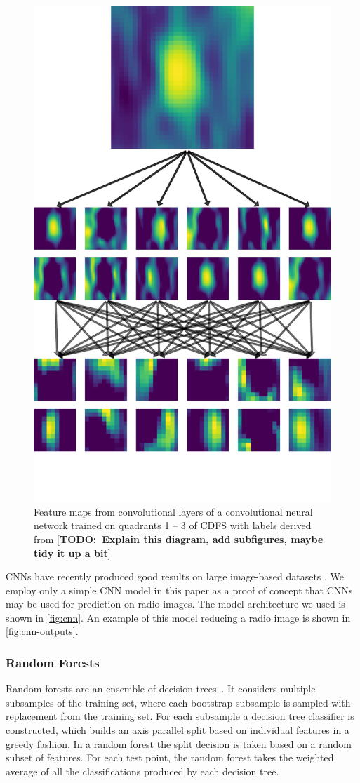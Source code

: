 \documentclass[fleqn,usenatbib,usedcolumn]{mnras}
\newcommand{\todo}[1]{ {\color{red}[{\bf TODO:~{#1}}]} }
\begin{document}
      \begin{figure}
      \centering
      \includegraphics[width=0.6\columnwidth]{convolutions_42191.pdf}
      \caption{Feature maps from convolutional layers of a convolutional neural
        network trained on quadrants 1 -- 3 of CDFS with labels derived from
        \citeauthor{norris06} \todo{Explain this diagram, add subfigures, maybe tidy it up a bit}}
      \label{fig:cnn-outputs}
      \end{figure}

      CNNs have recently produced good results on large image-based datasets
      \citep[e.g.][]{dieleman15cnn}. We employ only a simple CNN model in this
      paper as a proof of concept that CNNs may be used for prediction on radio
      images. The model architecture we used is shown in \autoref{fig:cnn}. An
      example of this model reducing a radio image is shown in
      \autoref{fig:cnn-outputs}.

    \subsubsection{Random Forests}
    \label{sec:random-forests}

      Random forests are an ensemble of decision
      trees~\citep{breiman01random-forest}. It considers multiple subsamples
      of the training set, where each bootstrap subsample is sampled with
      replacement from the training set. For each subsample a decision tree
      classifier is constructed, which builds an axis parallel split based on
      individual features in a greedy fashion. In a random forest the split
      decision is taken based on a random subset of features. For each test
      point, the random forest takes the weighted average of all the
      classifications produced by each decision tree.
\end{document}
